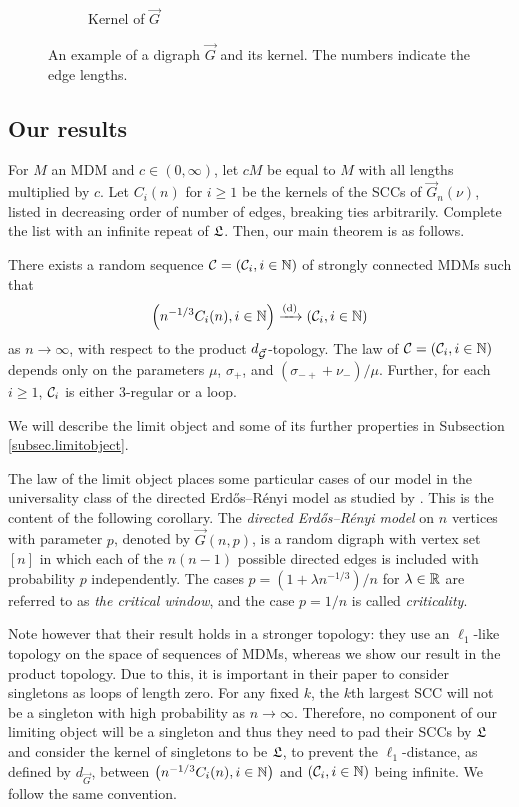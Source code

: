 \begin{figure}[htbp]
\begin{subfigure}[htbp]{0.45\textwidth}
        \caption{Kernel of $\vec{G}$}
    \end{subfigure}
    \caption{An example of a digraph $\vec{G}$ and its kernel. The numbers indicate the edge lengths.}
    \label{fig:kernel}
\end{figure}



\subsection{Our results}

For $M$ an MDM and $c\in (0,\infty)$, let $cM$ be equal to $M$ with all lengths multiplied by $c$. Let $C_i(n)$ for $i\geq 1$ be the kernels of the SCCs of $\vec{G}_n(\nu)$, listed in decreasing order of number of edges, breaking ties arbitrarily. Complete the list with an infinite repeat of $\mathfrak L$. Then, our main theorem is as follows.
\begin{theorem}\label{thm.main}
There exists a random sequence ${\mathcal C}=({\mathcal C}_i,i\in {\mathbb N})$ of strongly connected MDMs such that 
$$\left(n^{-1/3}C_i(n),i\in {\mathbb N}\right)\xrightarrow[]{\mathrm{(d)}}\left({\mathcal C}_i,i\in {\mathbb N}\right)$$
as $n\to \infty$, with respect to the product $d_{\vec{{\mathcal G}}}$-topology. The law of ${\mathcal C}=({\mathcal C}_i,i\in {\mathbb N})$ depends only on the parameters $\mu$, $\sigma_+$, and $(\sigma_{-+}+\nu_-)/\mu$. Further, for each $i\geq 1$, ${\mathcal C}_i$ is either $3$-regular or a loop.
\end{theorem}
We will describe the limit object and some of its further properties in Subsection \ref{subsec.limitobject}.

The law of the limit object places some particular cases of our model in the universality class of the directed Erd\H{o}s--Rényi model as studied by \citet{goldschmidtScalingLimitCritical2021}. This is the content of the following corollary. The \emph{directed Erd\H{o}s--Rényi model} on $n$ vertices with parameter $p$, denoted by $\vec{G}(n,p)$, is a random digraph with vertex set $[n]$ in which each of the $n(n-1)$ possible directed edges is included with probability $p$ independently. The cases $p=(1+\lambda n^{-1/3})/n$ for $\lambda\in{\mathbb R}$ are referred to as \emph{the critical window}, and the case $p=1/n$ is called \emph{criticality}.

Note however that their result holds in a stronger topology: they use an $\ell_1$-like topology on the space of sequences of MDMs, whereas we show our result in the product topology. Due to this, it is important in their paper to consider singletons as loops of length zero. For any fixed $k$, the $k$th largest SCC will not be a singleton with high probability as $n \to \infty$. Therefore, no component of our limiting object will be a singleton and thus they need to pad their SCCs by $\mathfrak L$ and consider the kernel of singletons to be $\mathfrak L$, to prevent the $\ell_1$-distance, as defined by $d_{\vec{G}}$, between $\left(n^{-1/3}C_i(n),i\in {\mathbb N}\right)$ and $\left({\mathcal C}_i,i\in {\mathbb N}\right)$ being infinite. We follow the same convention.

